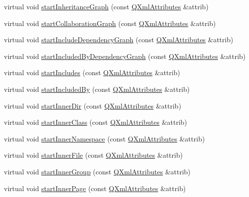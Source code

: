 \begin{DoxyCompactItemize}
\item 
virtual void \hyperlink{class_compound_handler_a590044022f067bcecd4bef1c145f0441}{start\+Inheritance\+Graph} (const \hyperlink{class_q_xml_attributes}{Q\+Xml\+Attributes} \&attrib)
\item 
virtual void \hyperlink{class_compound_handler_a7e62d6b114b82e2fa3b08be77b17414a}{start\+Collaboration\+Graph} (const \hyperlink{class_q_xml_attributes}{Q\+Xml\+Attributes} \&attrib)
\item 
virtual void \hyperlink{class_compound_handler_a0dbc6ea9e41bd8c041f30e0b88048386}{start\+Include\+Dependency\+Graph} (const \hyperlink{class_q_xml_attributes}{Q\+Xml\+Attributes} \&attrib)
\item 
virtual void \hyperlink{class_compound_handler_a5954850cd44c10f9cfbe397685d27965}{start\+Included\+By\+Dependency\+Graph} (const \hyperlink{class_q_xml_attributes}{Q\+Xml\+Attributes} \&attrib)
\item 
virtual void \hyperlink{class_compound_handler_a0c8a8570442c522490f745a67b3a8ea0}{start\+Includes} (const \hyperlink{class_q_xml_attributes}{Q\+Xml\+Attributes} \&attrib)
\item 
virtual void \hyperlink{class_compound_handler_a05aec5b2a0d7a2ec1f051d1ee2ec530e}{start\+Included\+By} (const \hyperlink{class_q_xml_attributes}{Q\+Xml\+Attributes} \&attrib)
\item 
virtual void \hyperlink{class_compound_handler_a23e8b99dbc930abc24de98cd6ba7e655}{start\+Inner\+Dir} (const \hyperlink{class_q_xml_attributes}{Q\+Xml\+Attributes} \&attrib)
\item 
virtual void \hyperlink{class_compound_handler_ac679de74dff995d610a56e02b0514450}{start\+Inner\+Class} (const \hyperlink{class_q_xml_attributes}{Q\+Xml\+Attributes} \&attrib)
\item 
virtual void \hyperlink{class_compound_handler_a0b045d1ad64a89a70ec6190f6984cc46}{start\+Inner\+Namespace} (const \hyperlink{class_q_xml_attributes}{Q\+Xml\+Attributes} \&attrib)
\item 
virtual void \hyperlink{class_compound_handler_ad164a8e627f8b9f0e90a911e8e0315b7}{start\+Inner\+File} (const \hyperlink{class_q_xml_attributes}{Q\+Xml\+Attributes} \&attrib)
\item 
virtual void \hyperlink{class_compound_handler_ad4f1a558819f11cfec06844cef9315c2}{start\+Inner\+Group} (const \hyperlink{class_q_xml_attributes}{Q\+Xml\+Attributes} \&attrib)
\item 
virtual void \hyperlink{class_compound_handler_a15312512eb7aa2b772885fc5e84eb410}{start\+Inner\+Page} (const \hyperlink{class_q_xml_attributes}{Q\+Xml\+Attributes} \&attrib)

\end{DoxyCompactItemize}
